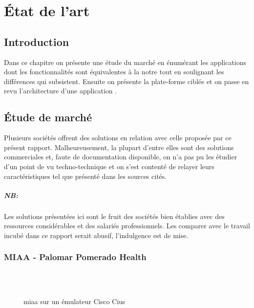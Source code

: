 
\chapter{État de l'art}
\section{Introduction}

Dans ce chapitre on présente une étude du marché en énumérant les
applications dont les fonctionnalités sont équivalentes à la notre tout
en soulignant les différences qui subsistent. Ensuite on présente la
plate-forme ciblée et on passe en revu l’architecture d’une application
\android{}.

\section{Étude de marché}

Plusieurs sociétés offrent des solutions en relation avec celle proposée
par ce présent rapport. Malheureusement, la plupart d’entre elles sont
des solutions commerciales et, faute de documentation disponible, on n’a
pas pu les étudier d’un point de vu techno-technique et on s’est
contenté de relayer leurs caractéristiques tel que présenté dans les
sources cités.

\paragraph{NB:} %
\label{par:nb}

Les solutions présentées ici sont le fruit des sociétés bien établies avec des ressources considérables et des salariés professionnels. Les comparer avec le travail incubé dans ce rapport serait abusif, l’indulgence est de mise.

\subsection{MIAA - Palomar Pomerado Health}

\begin{figure}
\centering
{}\\
\\
\caption{\gls{miaa} sur un émulateur Cisco Cius}
\label{fig:miaa}
\end{figure}

